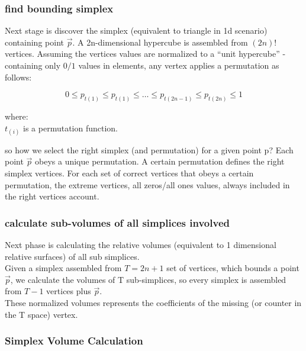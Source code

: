 		\subsubsection{find bounding simplex}
		
		Next stage is discover the simplex (equivalent to triangle in 1d scenario) containing point $\overrightarrow{p}$.
		A 2n-dimensional hypercube is assembled from $(2n)!$ vertices. 
		Assuming the vertices values are normalized to a “unit hypercube” - containing only $0/1$ values in elements, any vertex applies a permutation as follows:
		
		\begin{equation}
		0 \leq p_{t(1)} \leq p_{t(1)} \leq \dots \leq p_{t(2n-1)} \leq p_{t(2n)} \leq 1
		\end{equation}
		
		\cite{http://www.mathpages.com/home/kmath664/kmath664.htm}
		
		where:\\
		$t_{(i)}$ is a permutation function.
		
		so how we select the right simplex (and permutation) for a given point p?
		Each point $\overrightarrow{p}$ obeys a unique permutation. 
		A certain permutation defines the right simplex vertices. 
		For each set of correct vertices that obeys a certain permutation, the extreme vertices, all zeros/all ones values, always included in the right vertices account. 
		
		
		
		\subsubsection{calculate sub-volumes of all simplices involved}
		
		Next phase is calculating the relative volumes (equivalent to 1 dimensional relative surfaces) of all sub simplices. 
		\\Given a simplex assembled from $T = 2n+1$ set of vertices, which bounds a point $\overrightarrow{p}$, we calculate the volumes of T sub-simplices, so every simplex is assembled from $T-1$ vertices plus $\overrightarrow{p}$. 
		\\These normalized volumes represents the coefficients of the missing (or counter in the T space) vertex.
		
		
		\subsubsection{Simplex Volume Calculation}
		
